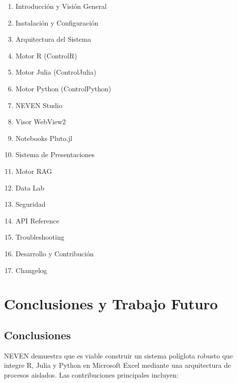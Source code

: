 \documentclass[12pt, a4paper]{report}
\begin{document}
\begin{enumerate}
    \item Introducción y Visión General
    \item Instalación y Configuración
    \item Arquitectura del Sistema
    \item Motor R (ControlR)
    \item Motor Julia (ControlJulia)
    \item Motor Python (ControlPython)
    \item NEVEN Studio
    \item Visor WebView2
    \item Notebooks Pluto.jl
    \item Sistema de Presentaciones
    \item Motor RAG
    \item Data Lab
    \item Seguridad
    \item API Reference
    \item Troubleshooting
    \item Desarrollo y Contribución
    \item Changelog
\end{enumerate}

\chapter{Conclusiones y Trabajo Futuro}

\section{Conclusiones}

NEVEN demuestra que es viable construir un sistema políglota robusto que integre R, Julia y Python en Microsoft Excel mediante una arquitectura de procesos aislados. Las contribuciones principales incluyen:
\end{document}
